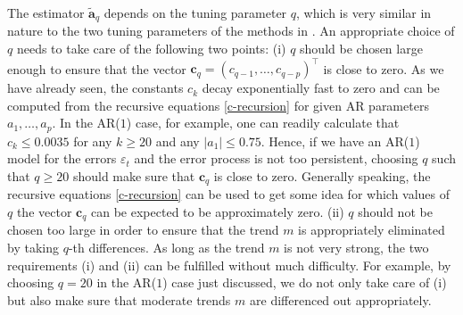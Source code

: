 The estimator $\widetilde{\boldsymbol{a}}_q$ depends on the tuning parameter $q$, which is very similar in nature to the two tuning parameters of the methods in \cite{Hall2003}. An appropriate choice of $q$ needs to take care of the following two points: 
(i) $q$ should be chosen large enough to ensure that the vector $\boldsymbol{c}_q = (c_{q-1},\dots,c_{q-p})^\top$ is close to zero. As we have already seen, the constants $c_k$ decay exponentially fast to zero and can be computed from the recursive equations \eqref{c-recursion} for given AR parameters $a_1,\ldots,a_p$. In the AR($1$) case, for example, one can readily calculate that $c_k \le 0.0035$ for any $k \ge 20$ and any $|a_1| \le 0.75$. Hence, if we have an AR($1$) model for the errors $\varepsilon_t$ and the error process is not too persistent, choosing $q$ such that $q \ge 20$ should make sure that $\boldsymbol{c}_q$ is close to zero. Generally speaking, the recursive equations \eqref{c-recursion} can be used to get some idea for which values of $q$ the vector $\boldsymbol{c}_q$ can be expected to be approximately zero. 
(ii) $q$ should not be chosen too large in order to ensure that the trend $m$ is appropriately eliminated by taking $q$-th differences. As long as the trend $m$ is not very strong, the two requirements (i) and (ii) can be fulfilled without much difficulty. For example, by choosing $q = 20$ in the AR($1$) case just discussed, we do not only take care of (i) but also make sure that moderate trends $m$ are differenced out appropriately. 


